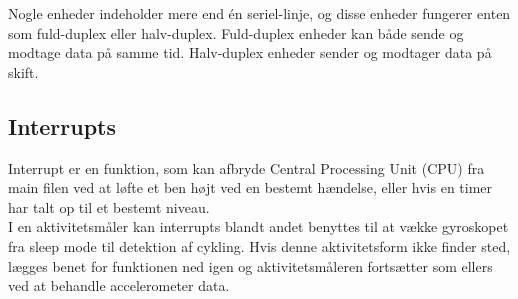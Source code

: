 Nogle enheder indeholder mere end én seriel-linje, og disse enheder fungerer enten som fuld-duplex eller halv-duplex. Fuld-duplex enheder kan både sende og modtage data på samme tid. Halv-duplex enheder sender og modtager data på skift.~\citep{Jimb02016a,Chun-zhiYin-shuiLun-yao2011}

\subsection{Interrupts}
Interrupt er en funktion, som kan afbryde Central Processing Unit (CPU) fra main filen ved at løfte et ben højt ved en bestemt hændelse, eller hvis en timer har talt op til et bestemt niveau.~\citep{Badiger2016} \\
I en aktivitetsmåler kan interrupts blandt andet benyttes til at vække gyroskopet fra sleep mode til detektion af cykling. Hvis denne aktivitetsform ikke finder sted, lægges benet for funktionen ned igen og aktivitetsmåleren fortsætter som ellers ved at behandle accelerometer data.

